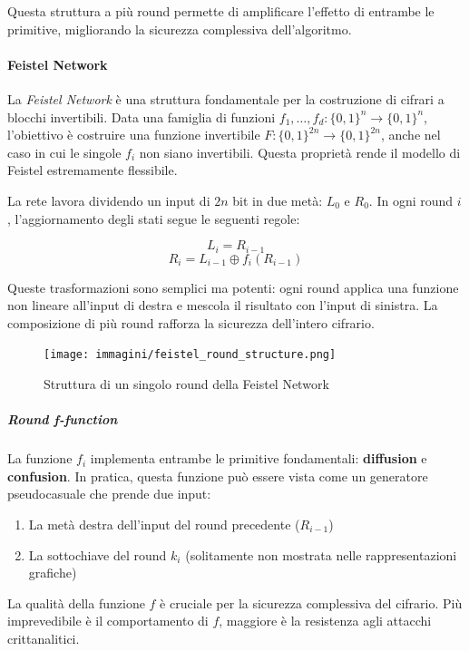 \documentclass{report}
\begin{document}
Questa struttura a più round permette di amplificare l'effetto di entrambe le primitive, migliorando la sicurezza complessiva dell'algoritmo.
    
\paragraph{Feistel Network}

La \textit{Feistel Network} è una struttura fondamentale per la costruzione di cifrari a blocchi invertibili. Data una famiglia di funzioni $f_1, \dots, f_d : \{0,1\}^n \rightarrow \{0,1\}^n$, l'obiettivo è costruire una funzione invertibile $F : \{0,1\}^{2n} \rightarrow \{0,1\}^{2n}$, anche nel caso in cui le singole $f_i$ non siano invertibili. Questa proprietà rende il modello di Feistel estremamente flessibile.

La rete lavora dividendo un input di $2n$ bit in due metà: $L_0$ e $R_0$. In ogni round $i$, l’aggiornamento degli stati segue le seguenti regole:

\[
L_i = R_{i-1}
\]
\[
R_i = L_{i-1} \oplus f_i(R_{i-1})
\]

Queste trasformazioni sono semplici ma potenti: ogni round applica una funzione non lineare all’input di destra e mescola il risultato con l’input di sinistra. La composizione di più round rafforza la sicurezza dell'intero cifrario.

\begin{figure}[h]
\centering
\texttt{[image: immagini/feistel\_round\_structure.png]}
\caption{Struttura di un singolo round della Feistel Network}
\end{figure}

\subparagraph{Round f-function}

La funzione $f_i$ implementa entrambe le primitive fondamentali: \textbf{diffusion} e \textbf{confusion}. In pratica, questa funzione può essere vista come un generatore pseudocasuale che prende due input:
\begin{enumerate}
    \item La metà destra dell'input del round precedente ($R_{i-1}$)
    \item La sottochiave del round $k_i$ (solitamente non mostrata nelle rappresentazioni grafiche)
\end{enumerate}

La qualità della funzione $f$ è cruciale per la sicurezza complessiva del cifrario. Più imprevedibile è il comportamento di $f$, maggiore è la resistenza agli attacchi crittanalitici.
\end{document}
